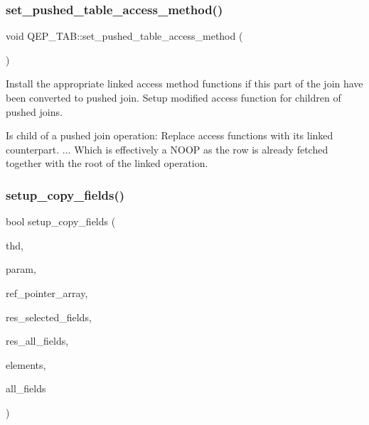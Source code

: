 \subsubsection{\texorpdfstring{set\+\_\+pushed\+\_\+table\+\_\+access\+\_\+method()}{set\_pushed\_table\_access\_method()}}
{\footnotesize\ttfamily void Q\+E\+P\+\_\+\+T\+A\+B\+::set\+\_\+pushed\+\_\+table\+\_\+access\+\_\+method (\begin{DoxyParamCaption}\item[{void}]{ }\end{DoxyParamCaption})}

Install the appropriate \textquotesingle{}linked\textquotesingle{} access method functions if this part of the join have been converted to pushed join. Setup modified access function for children of pushed joins.

Is child of a pushed join operation\+: Replace access functions with its linked counterpart. ... Which is effectively a N\+O\+OP as the row is already fetched together with the root of the linked operation.\mbox{\label{group__Query__Executor_gaea6e7f59b9cca648046cf55fe5a95732}} 
\subsubsection{\texorpdfstring{setup\+\_\+copy\+\_\+fields()}{setup\_copy\_fields()}}
{\footnotesize\ttfamily bool setup\+\_\+copy\+\_\+fields (\begin{DoxyParamCaption}\item[{T\+HD $\ast$}]{thd,  }\item[{Temp\+\_\+table\+\_\+param $\ast$}]{param,  }\item[{\mbox{\hyperlink{classBounds__checked__array}{Ref\+\_\+ptr\+\_\+array}}}]{ref\+\_\+pointer\+\_\+array,  }\item[{\mbox{\hyperlink{classList}{List}}$<$ \mbox{\hyperlink{classItem}{Item}} $>$ \&}]{res\+\_\+selected\+\_\+fields,  }\item[{\mbox{\hyperlink{classList}{List}}$<$ \mbox{\hyperlink{classItem}{Item}} $>$ \&}]{res\+\_\+all\+\_\+fields,  }\item[{uint}]{elements,  }\item[{\mbox{\hyperlink{classList}{List}}$<$ \mbox{\hyperlink{classItem}{Item}} $>$ \&}]{all\+\_\+fields }\end{DoxyParamCaption})}

